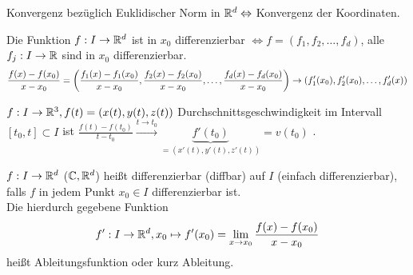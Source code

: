 \documentclass[../ana1.tex]{subfiles}
\begin{document}
\begin{bem}
    Konvergenz bezüglich Euklidischer Norm in \( \mathbb{R}^d 
    \Leftrightarrow \) Konvergenz der Koordinaten.
\end{bem}
\begin{lem}
    Die Funktion \( f : I \rightarrow \mathbb{R}^d \) ist in \(x_0\) 
    differenzierbar \( \Leftrightarrow f = (f_1,f_2,\ldots,f_d) \), 
    alle \( f_j : I \rightarrow \mathbb{R} \) sind in \( x_0 \) 
    differenzierbar.
    \[ \frac{f(x) - f(x_0)}{x-x_0} = \left( 
        \frac{ f_1(x) - f_1(x_0) }{x-x_0} ,
        \frac{ f_2(x) - f_2(x_0) }{x-x_0} ,
        \ldots ,
        \frac{ f_d(x) - f_d(x_0) }{x-x_0} \right) 
        \rightarrow (f_1'(x_0), f_2'(x_0), \ldots, f_d'(x)) \]
\end{lem}
\begin{bsp}
    \( f: I \rightarrow \mathbb{R}^3, f(t) = (x(t), y(t), z(t)) \) 
    Durchschnittsgeschwindigkeit im Intervall \( [t_0, t] 
    \subset I \) ist \( \frac{f(t) - f(t_0)}{t - t_0} 
    \overset{t\rightarrow t_0}{\longrightarrow} \underbrace{ 
        f'(t_0) }_{ = (x'(t), y'(t) ,z'(t))}
    = v(t_0) \) .
\end{bsp}
\begin{defi}[Ableitungsfunktion]
    \( f : I \rightarrow \mathbb{R}^d \) (\( \mathbb{C}, \mathbb{R}^d \)) heißt 
    differenzierbar (diffbar) auf \(I\) (einfach differenzierbar), 
    falls \(f\) in jedem Punkt \( x_0 \in I \) differenzierbar ist. \\
    Die hierdurch gegebene Funktion 
    \[ f': I \rightarrow \mathbb{R}^d, x_0 \mapsto f'(x_0) 
    = \lim\limits_{x\rightarrow x_0} \frac{f(x) - f(x_0)}{x - x_0} \]
    heißt Ableitungsfunktion oder kurz Ableitung.
\end{defi}
\end{document}
